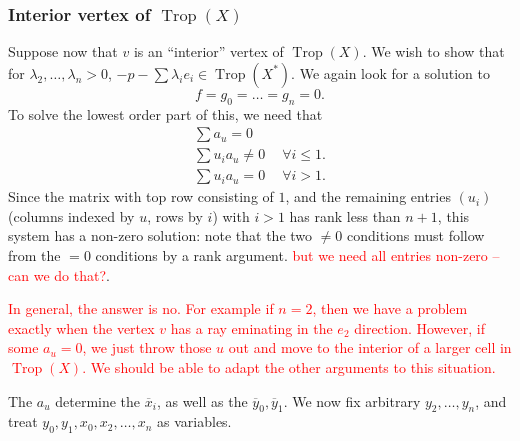\documentclass[oneside]{amsart}
\DeclareMathOperator{\trop}{Trop}
\theoremstyle{definition}
\newcommand{\nathan}[1]{\textcolor{red}{#1}}
\begin{document}
\subsubsection{Interior vertex of $\trop(X)$}
Suppose now that $v$ is an ``interior'' vertex of $\trop(X)$. We wish to show that for $\lambda_2,\ldots,\lambda_{n}>0$, $-p-\sum \lambda_i e_i\in\trop(X^*)$. We again look for a solution to 
\[f=g_0=\ldots=g_n=0.\]
To solve the lowest order part of this, we need that
\begin{align*}
\sum a_u=0\\
\sum u_i a_u \neq  0\ \quad \forall i\leq 1.\\
\sum u_i a_u = 0\ \quad \forall i>1.
\end{align*}
Since the matrix with top row consisting of $1$, and the remaining entries $(u_i)$ (columns indexed by $u$, rows by $i$) with $i>1$ has rank less than $n+1$, this system has a non-zero solution: note that the two $\neq 0$ conditions must follow from the $=0$ conditions by a rank argument.
 \nathan{but we need all entries non-zero -- can we do that?}.

\nathan{In general, the answer is no. For example if $n=2$, then we have a problem exactly when the vertex $v$ has a ray eminating in the $e_2$ direction. However, if some $a_u=0$, we just throw those $u$ out and move to the interior of a larger cell in $\trop(X)$. We should be able to adapt the other arguments to this situation.}


The $a_u$ determine the $\overline{x}_i$, as well as the $\overline{y}_0,\overline{y}_1$. We now fix arbitrary $y_2,\ldots,y_n$, and treat $y_0,y_1,x_0,x_2,\ldots,x_n$ as variables.
\end{document}
